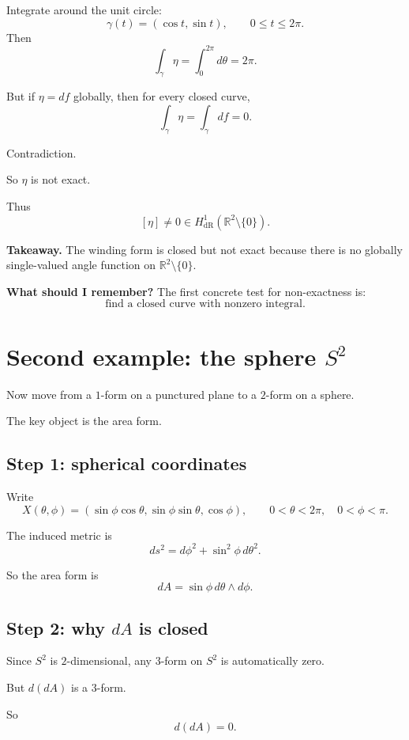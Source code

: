 \documentclass[11pt]{article}
\newenvironment{takeaway}
{\begin{framed}\noindent\textbf{Takeaway. }}
{\end{framed}}
\newenvironment{remember}
{\begin{framed}\noindent\textbf{What should I remember? }}
{\end{framed}}
\begin{document}
Integrate around the unit circle:
\[
\gamma(t)=(\cos t,\sin t),\qquad 0\le t\le 2\pi.
\]
Then
\[
\int_\gamma \eta=\int_0^{2\pi} d\theta=2\pi.
\]

But if \(\eta=df\) globally, then for every closed curve,
\[
\int_\gamma \eta=\int_\gamma df=0.
\]

Contradiction.

So \(\eta\) is not exact.

Thus
\[
[\eta]\neq 0 \in H^1_{\mathrm{dR}}(\mathbb{R}^2\setminus\{0\}).
\]

\begin{takeaway}
The winding form is closed but not exact because there is no globally single-valued angle function on \(\mathbb{R}^2\setminus\{0\}\).
\end{takeaway}

\begin{remember}
The first concrete test for non-exactness is:
\[
\text{find a closed curve with nonzero integral.}
\]
\end{remember}

\section{Second example: the sphere \(S^2\)}

Now move from a \(1\)-form on a punctured plane to a \(2\)-form on a sphere.

The key object is the area form.

\subsection{Step 1: spherical coordinates}

Write
\[
X(\theta,\phi)=
(\sin\phi\cos\theta,\sin\phi\sin\theta,\cos\phi),
\qquad
0<\theta<2\pi,\quad 0<\phi<\pi.
\]

The induced metric is
\[
ds^2=d\phi^2+\sin^2\phi\,d\theta^2.
\]

So the area form is
\[
dA=\sin\phi\,d\theta\wedge d\phi.
\]

\subsection{Step 2: why \(dA\) is closed}

Since \(S^2\) is \(2\)-dimensional, any \(3\)-form on \(S^2\) is automatically zero.

But \(d(dA)\) is a \(3\)-form.

So
\[
d(dA)=0.
\]
\end{document}
